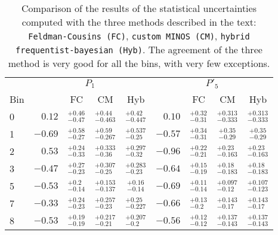 \begin{table*}
  \begin{center}
    \caption{Comparison of the results of the statistical uncertainties computed with the three methods described in the text: {\tt Feldman-Cousins (FC)}, {\tt custom MINOS (CM)}, {\tt hybrid frequentist-bayesian (Hyb)}.
      The agreement of the three method is very good for all the bins, with very few exceptions.}
    \label{tab:FCcomparison}

    \begin{tabular}{l|rccc|rccc}
      & \multicolumn{4}{c|}{$P_1$}       &  \multicolumn{4}{c}{$P'_5$} \\ 
      Bin  & & FC & CM & Hyb       & & FC & CM & Hyb    \\ 
      \hline
      0 & $ 0.12$ &  $^{+ 0.46}_{- 0.47}$  & $^{+ 0.44 }_{- 0.463 }$ & $^{+ 0.42 }_{- 0.447 }$  & $ 0.10$ & $^{+ 0.32}_{- 0.31}$ & $^{+ 0.313 }_{- 0.333 }$ & $^{+ 0.313 }_{- 0.333 }$ \\
      1 & $-0.69$ &  $^{+ 0.58}_{- 0.27}$  & $^{+ 0.59 }_{- 0.267 }$ & $^{+ 0.537 }_{- 0.25 }$  & $-0.57$ & $^{+ 0.34}_{- 0.31}$ & $^{+ 0.35 }_{- 0.29 }$ & $^{+ 0.35 }_{- 0.29 }$     \\
      2 & $ 0.53$ &  $^{{+ 0.24}}_{- 0.33}$  & $^{{+ 0.333 }}_{- 0.36 }$ & $^{{+ 0.297 }}_{- 0.32 }$  & $-0.96$ & $^{+ 0.22}_{{- 0.21}}$ & $^{+ 0.23 }_{{- 0.163 }}$ & $^{+ 0.23 }_{{- 0.163 }}$   \\
      3 & $-0.47$ &  $^{+ 0.27}_{- 0.23}$  & $^{+ 0.307 }_{- 0.25 }$ & $^{+ 0.283 }_{- 0.23 }$  & $-0.64$ & $^{+ 0.15}_{- 0.19}$ & $^{+ 0.18 }_{- 0.183 }$ & $^{+ 0.18 }_{- 0.183 }$   \\
      \hline                                                                                                                         
      5 & $-0.53$ &  $^{{+ 0.2}}_{- 0.14} $  & $^{{+ 0.153} }_{- 0.137 }$ & $^{{+ 0.16} }_{- 0.14 }$  & $-0.69$ & $^{+ 0.11}_{- 0.14}$ & $^{+ 0.097 }_{- 0.12 }$ & $^{+ 0.107 }_{- 0.123 }$ \\
      \hline                                                                                                                                           
      7 & $-0.33$ &  $^{+ 0.24}_{- 0.23}$  & $^{+ 0.257 }_{- 0.23 }$ & $^{+ 0.25 }_{- 0.227 }$  & $-0.66$ & $^{+ 0.13}_{- 0.2}$  & $^{+ 0.143 }_{- 0.17 }$ & $^{+ 0.143 }_{- 0.17 }$  \\
      8 & $-0.53$ &  $^{+ 0.19}_{- 0.19}$  & $^{+ 0.217 }_{- 0.21 }$ & $^{+ 0.207 }_{- 0.2 }$   & $-0.56$ & $^{+ 0.12}_{- 0.12}$ & $^{+ 0.137 }_{- 0.143 }$ & $^{+ 0.137 }_{- 0.143 }$\\


    \end{tabular}
  \end{center}
\end{table*}



